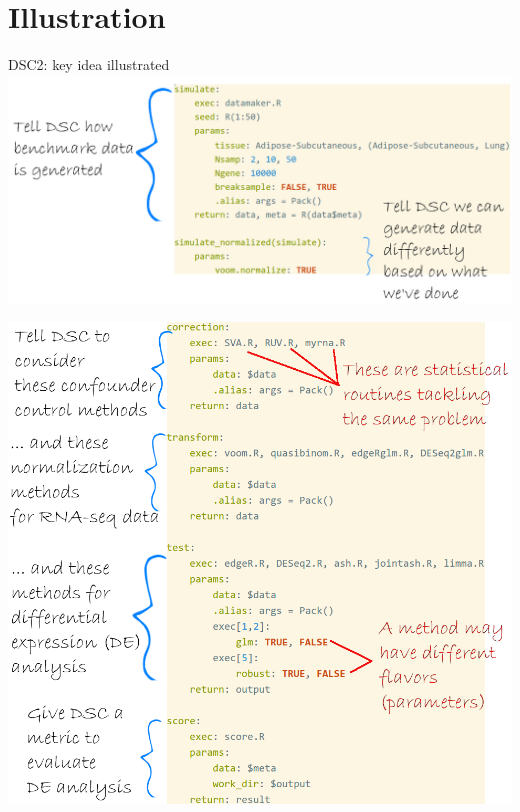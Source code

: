 \section{Illustration}
\begin{frame}{DSC2: key idea illustrated}
  \centering \includegraphics[width=\textwidth]{figs/dsc1}
\end{frame}
\begin{withoutheadline}
\begin{frame}
  \centering \includegraphics[height=\textheight]{figs/dsc2}
\end{frame}
\end{withoutheadline}
